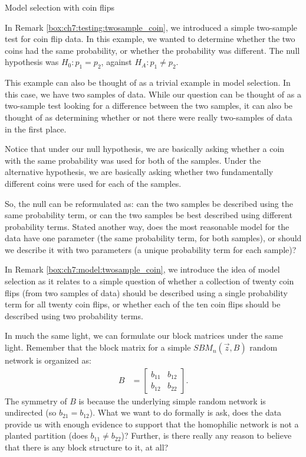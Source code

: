 \begin{floatingbox}[h]\caption{Model selection with coin flips}
\label{box:ch7:model:twosample_coin}
In Remark \ref{box:ch7:testing:twosample_coin}, we introduced a simple two-sample test for coin flip data. In this example, we wanted to determine whether the two coins had the same probability, or whether the probability was different. The null hypothesis was $H_0 : p_1 = p_2$, against $H_A : p_1 \neq p_2$. 

This example can also be thought of as a trivial example in model selection. In this case, we have two samples of data. While our question can be thought of as a two-sample test looking for a difference between the two samples, it can also be thought of as determining whether or not there were really two-samples of data in the first place.

Notice that under our null hypothesis, we are basically asking whether a coin with the same probability was used for both of the samples. Under the alternative hypothesis, we are basically asking whether two fundamentally different coins were used for each of the samples.

So, the null can be reformulated as: can the two samples be described using the same probability term, or can the two samples be best described using different probability terms. Stated another way, does the most reasonable model for the data have one parameter (the same probability term, for both samples), or should we describe it with two parameters (a unique probability term for each sample)?
\end{floatingbox}

In Remark \ref{box:ch7:model:twosample_coin}, we introduce the idea of model selection as it relates to a simple question of whether a collection of twenty coin flips (from two samples of data) should be described using a single probability term for all twenty coin flips, or whether each of the ten coin flips should be described using two probability terms.

In much the same light, we can formulate our block matrices under the same light. Remember that the block matrix for a simple $SBM_n(\vec z, B)$ random network is organized as:
\begin{align*}
    B &= \begin{bmatrix}
        b_{11} & b_{12} \\
        b_{12} & b_{22}
    \end{bmatrix}.
\end{align*}
The symmetry of $B$ is because the underlying simple random network is undirected (so $b_{21} = b_{12}$). What we want to do formally is ask, does the data provide us with enough evidence to support that the homophilic network is not a planted partition (does $b_{11} \neq b_{22}$)? Further, is there really any reason to believe that there is any block structure to it, at all?

